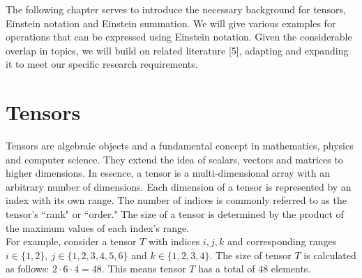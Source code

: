 The following chapter serves to introduce the necessary background for tensors,
Einstein notation and Einstein summation. We will give various examples for
operations that can be expressed using Einstein notation. Given the considerable
overlap in topics, we will build on related literature [5], adapting and expanding
it to meet our specific research requirements.

\section{Tensors}
Tensors are algebraic objects and a fundamental concept in mathematics, physics
and computer science. They extend the idea of scalars, vectors and matrices to
higher dimensions. In essence, a tensor is a multi-dimensional array with an arbitrary
number of dimensions. Each dimension of a tensor is represented by an index with
its own range. The number of indices is commonly referred to as the tensor's ``rank"
or ``order." The size of a tensor is determined by the product of the maximum values
of each index's range.\\
For example, consider a tensor $T$ with indices $i,j,k$ and corresponding ranges
$i \in \{1,2\},\ j \in \{1,2,3,4,5,6\}$ and $k \in \{1,2,3,4\}$. The size of
tensor $T$ is calculated as follows: $2 \cdot 6 \cdot 4 = 48$. This means tensor
$T$ has a total of $48$ elements.


